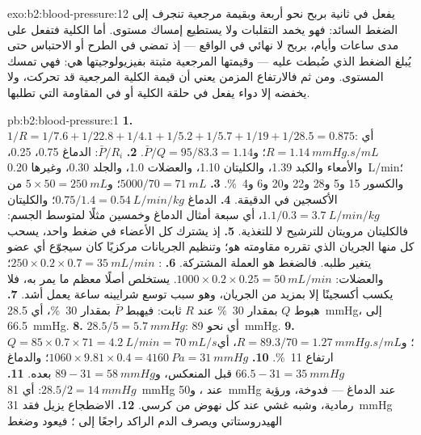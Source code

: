 \begin{solution}{exo:b2:blood-pressure:12}
 يفعل في ثانية بربح نحو أربعة وبقيمة
مرجعية تنجرف إلى الضغط السائد: فهو يخمد التقلبات
ولا يستطيع إمساك مستوى. أما الكلية فتفعل على مدى ساعات وأيام،
بربح لا نهائي في الواقع --- إذ تمضي في الطرح أو الاحتباس حتى
يُبلغ الضغط الذي ضُبطت عليه --- وقيمتها المرجعية مثبتة
بفيزيولوجيتها هي: فهي تمسك المستوى. ومن ثم فالارتفاع المزمن
يعني أن قيمة الكلية المرجعية قد تحركت، ولا يخفضه إلا دواء يفعل
في حلقة الكلية أو في المقاومة التي تطلبها.
\end{solution}

\begin{solution}{pb:b2:blood-pressure:1}
\textbf{1.} $1/R = 1/7.6 + 1/22.8 + 1/4.1 + 1/5.2 + 1/5.7 + 1/19 +
1/28.5 = 0.875$: أي $R = \qty{1.14}{mmHg.s/mL}$؛ و$\bar P/Q = 95/83.3 =
1.14$.
\textbf{2.} $\bar P/R_i$: الدماغ 0.75،  0.25، والأمعاء والكبد
1.39، والكليتان 1.10، والعضلات 1.0، والجلد 0.30، وغيرها \qty{0.20}{L/min}؛
والكسور 15 و5 و28 و22 و20 و6 و\qty{4}{\%}.
\textbf{3.} $5000/70 = \qty{71}{mL}$؛ و$5\times 50 = \qty{250}{mL}$ من
الأكسجين في الدقيقة.
\textbf{4.} الدماغ $0.75/1.4 = \qty{0.54}{L/min/kg}$؛ والكليتان $1.1/0.3
= \qty{3.7}{L/min/kg}$، أي سبعة أمثال الدماغ وخمسين مثلًا لمتوسط
الجسم: فالكليتان مرويتان للترشيح لا للتغذية.
\textbf{5.} إذ يشترك كل الأعضاء في ضغط واحد، يسحب كل منها
الجريان الذي تقرره مقاومته هو؛ وتنظيم الجريانات مركزيًا كان
سيجوّع أي عضو يتغير طلبه. فالضغط هو العملة
المشتركة.
\textbf{6.} : $250\times 0.2\times 0.7 = \qty{35}{mL/min}$؛
والعضلات: $1000\times 0.2\times 0.25 = \qty{50}{mL/min}$. 
يستخلص أصلًا معظم ما يمر به، فلا يكسب أكسجينًا إلا
بمزيد من الجريان، وهو سبب توسع شرايينه ساعة يعمل
أشد.
\textbf{7.} هبوط $Q$ بمقدار \qty{30}{\%} عند $R$ ثابت: فيهبط $\bar P$
بمقدار \qty{30}{\%}، أي \qty{28.5}{mmHg}، إلى \qty{66.5}{mmHg}.
\textbf{8.} $28.5/5 = \qty{5.7}{mmHg}$: أي نحو \qty{89}{mmHg}.
\textbf{9.} $Q = 85\times 0.7\times 71 = \qty{4.2}{L/min} =
\qty{70}{mL/s}$؛ و$R = 89.3/70 = \qty{1.27}{mmHg.s/mL}$، أي ارتفاع
\qty{11}{\%}.
\textbf{10.} $1060\times 9.81\times 0.4 = \qty{4160}{Pa} =
\qty{31}{mmHg}$؛ والدماغ $66.5 - 31 = \qty{35}{mmHg}$ قبل المنعكس،
و$89 - 31 = \qty{58}{mmHg}$ بعده.
\textbf{11.} $28.5/2 = \qty{14}{mmHg}$: أي \qty{81}{mmHg} عند ،
و\qty{50}{mmHg} عند الدماغ --- فدوخة، ورؤية رمادية، وشبه غشي
عند كل نهوض من كرسي.
\textbf{12.} الاضطجاع يزيل فقد \qty{31}{mmHg} الهيدروستاتي
ويصرف الدم الراكد راجعًا إلى ؛ فيعود  وضغط

\end{solution}
